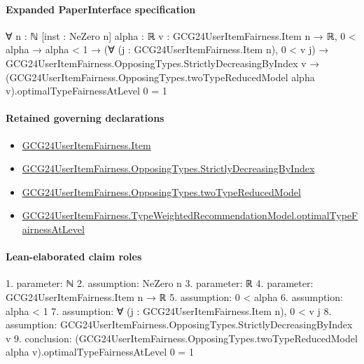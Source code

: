 \documentclass[10pt]{article}
\begin{document}
\paragraph{Expanded PaperInterface specification}
\begin{ReviewVerbatim}
∀ {n : ℕ} [inst : NeZero n] {alpha : ℝ} {v : GCG24UserItemFairness.Item n → ℝ},
  0 < alpha →
    alpha < 1 →
      (∀ (j : GCG24UserItemFairness.Item n), 0 < v j) →
        GCG24UserItemFairness.OpposingTypes.StrictlyDecreasingByIndex v →
          (GCG24UserItemFairness.OpposingTypes.twoTypeReducedModel alpha v).optimalTypeFairnessAtLevel 0 = 1
\end{ReviewVerbatim}

\paragraph{Retained governing declarations}
\begin{itemize}\raggedright
\item \hyperlink{governing-declaration-a7c560a429c6e204}{GCG24\allowbreak{}User\allowbreak{}Item\allowbreak{}Fairness.\allowbreak{}Item}
\item \hyperlink{governing-declaration-8278344d2ddef9a8}{GCG24\allowbreak{}User\allowbreak{}Item\allowbreak{}Fairness.\allowbreak{}Opposing\allowbreak{}Types.\allowbreak{}Strictly\allowbreak{}Decreasing\allowbreak{}By\allowbreak{}Index}
\item \hyperlink{governing-declaration-b87168913e966e7f}{GCG24\allowbreak{}User\allowbreak{}Item\allowbreak{}Fairness.\allowbreak{}Opposing\allowbreak{}Types.\allowbreak{}two\allowbreak{}Type\allowbreak{}Reduced\allowbreak{}Model}
\item \hyperlink{governing-declaration-b2424777beced29a}{GCG24\allowbreak{}User\allowbreak{}Item\allowbreak{}Fairness.\allowbreak{}Type\allowbreak{}Weighted\allowbreak{}Recommendation\allowbreak{}Model.\allowbreak{}optimal\allowbreak{}Type\allowbreak{}Fairness\allowbreak{}At\allowbreak{}Level}
\end{itemize}
\paragraph{Lean-elaborated claim roles}\begin{ReviewVerbatim}
1. parameter: ℕ
2. assumption: NeZero n
3. parameter: ℝ
4. parameter: GCG24UserItemFairness.Item n → ℝ
5. assumption: 0 < alpha
6. assumption: alpha < 1
7. assumption: ∀ (j : GCG24UserItemFairness.Item n), 0 < v j
8. assumption: GCG24UserItemFairness.OpposingTypes.StrictlyDecreasingByIndex v
9. conclusion: (GCG24UserItemFairness.OpposingTypes.twoTypeReducedModel alpha v).optimalTypeFairnessAtLevel 0 = 1
\end{ReviewVerbatim}
\end{document}
